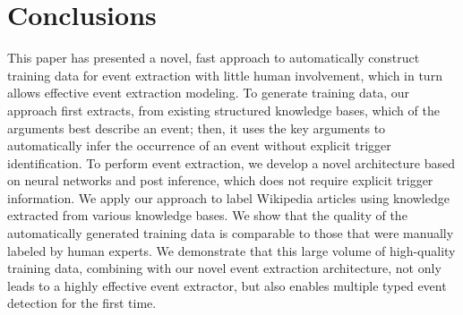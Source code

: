 \section{Conclusions}
This paper has presented a novel, fast approach to automatically construct training data for event extraction with little human
involvement, which in turn allows effective event extraction modeling. To generate training data, our approach first extracts, from
existing structured knowledge bases, which of the arguments best describe an event; then, it uses the key arguments to automatically infer
the occurrence of an event without explicit trigger identification. To perform event extraction, we develop a novel architecture based on
neural networks and post inference, which does not require explicit trigger information. We apply our approach to label Wikipedia articles
using knowledge extracted from various knowledge bases. We show that the quality of the automatically generated training data is comparable
to those that were manually labeled by human experts. We demonstrate that this large volume of high-quality training data, combining with
 our novel event extraction architecture, not only leads to a highly effective event extractor, but also enables multiple typed event
detection for the first time.




%
